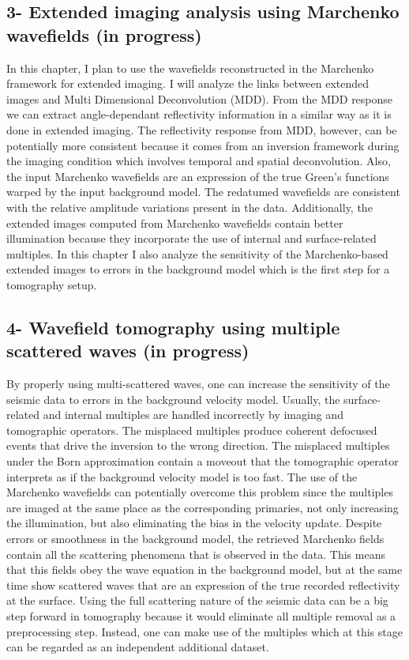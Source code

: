 \subsection{3- Extended imaging analysis  using Marchenko wavefields (in progress) }
In this chapter, I plan to use the wavefields reconstructed in the Marchenko framework
for extended imaging. I will analyze the links between extended images and Multi Dimensional Deconvolution (MDD). 
 From the MDD response we can extract angle-dependant reflectivity information in 
a similar way as it is done in extended imaging.
 The reflectivity response from MDD, however, can be potentially more 
consistent because it comes from an inversion framework during the imaging condition which involves temporal and spatial
deconvolution. Also, the input Marchenko wavefields are  an expression of the true 
Green's functions warped by the input background model. The redatumed wavefields are 
consistent with the relative amplitude variations present in the data. Additionally, 
 the extended images computed from Marchenko wavefields contain better illumination because
they incorporate the use of internal and surface-related multiples. 
 In this chapter I also analyze the sensitivity of the Marchenko-based extended images
to errors in the background model which is the first step for a tomography setup. 



\subsection{4- Wavefield tomography using multiple scattered waves (in progress)} 
By properly using multi-scattered waves, one can increase the sensitivity of the seismic
data to errors in the background velocity model. Usually, the surface-related and internal
multiples are handled incorrectly by imaging and tomographic operators. The 
misplaced multiples produce coherent defocused events that drive the inversion
to the wrong direction. The misplaced multiples under the Born approximation 
contain a moveout that the tomographic operator interprets as if the background velocity model is too fast.   
 The use of the Marchenko wavefields can potentially overcome this problem since 
the multiples are imaged at the same place as the corresponding primaries, not only  increasing
the illumination, but also eliminating the bias in the velocity update. 
 Despite errors or smoothness in the background model, the retrieved Marchenko fields
contain all the scattering phenomena that is observed in the data. This means that
this fields obey the wave equation in the background model, but at the same time 
show scattered waves that are an expression of the true recorded reflectivity
at the surface. Using the full scattering nature of the seismic data 
can be a big step forward in tomography because it would eliminate all
multiple removal as a preprocessing step. Instead, one can make use of the multiples
which at this stage can be regarded as an independent additional dataset. 



